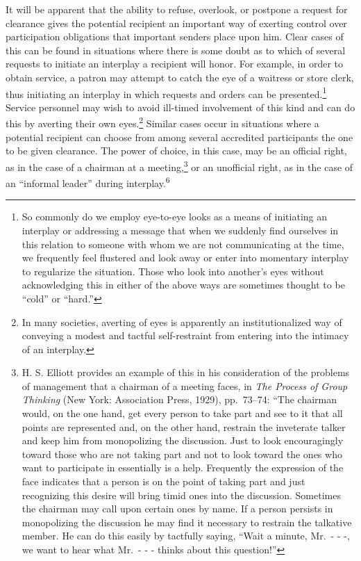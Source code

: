 \documentclass[twoside,symmetric,nobib,justified]{tufte-book}
\begin{document}
It will be apparent that the ability to refuse, overlook, or postpone a
request for clearance gives the potential recipient an important way of
exerting control over participation obligations that important senders
place upon him. Clear cases of this can be found in situations where
there is some doubt as to which of several requests to initiate an
interplay a recipient will honor. For example, in order to obtain
service, a patron may attempt to catch the eye of a waitress or store
clerk, thus initiating an interplay in which requests and orders can be
presented.\footnote{So commonly do we employ eye-to-eye looks as a means
  of initiating an interplay or addressing a message that when we
  suddenly find ourselves in this relation to someone with whom we are
  not communicating at the time, we frequently feel flustered and look
  away or enter into momentary interplay to regularize the situation.
  Those who look into another's eyes without acknowledging this in
  either of the above ways are sometimes thought to be ``cold'' or
  ``hard.''} Service personnel may wish to avoid ill-timed involvement
of this kind and can do this by averting their own eyes.\footnote{In
  many societies, averting of eyes is apparently an institutionalized
  way of conveying a modest and tactful self-restraint from entering
  into the intimacy of an interplay.} Similar cases occur in situations
where a potential recipient can choose from among several accredited
participants the one to be given clearance. The power of choice, in this
case, may be an official right, as in the case of a chairman at a
meeting,\footnote{H. S. Elliott provides an example of this in his
  consideration of the problems of management that a chairman of a
  meeting faces, in \emph{The Process of Group Thinking} (New York:
  Association Press, 1929), pp.~73--74: ``The chairman would, on the one
  hand, get every person to take part and see to it that all points are
  represented and, on the other hand, restrain the inveterate talker and
  keep him from monopolizing the discussion. Just to look encouragingly
  toward those who are not taking part and not to look toward the ones
  who want to participate in essentially is a help. Frequently the
  expression of the face indicates that a person is on the point of
  taking part and just recognizing this desire will bring timid ones
  into the discussion. Sometimes the chairman may call upon certain ones
  by name. If a person persists in monopolizing the discussion he may
  find it necessary to restrain the talkative member. He can do this
  easily by tactfully saying, ``Wait a minute, Mr.~- - -, we want to
  hear what Mr.~- - - thinks about this question!''} or an unofficial
right, as in the case of an ``informal leader'' during
interplay.\textsuperscript{6}
\end{document}
